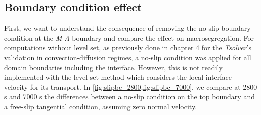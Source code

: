 
\subsection{Boundary condition effect}

First, we want to understand the consequence of removing the no-slip boundary condition at the \emph{M-A} boundary and compare the effect on macrosegregation. 
For computations without level set, as previously done in chapter 4 for the \emph{Tsolver}'s validation in convection-diffusion regimes, a no-slip condition was applied for all domain boundaries including 
the interface.
However, this is not readily implemented with the level set method which considers the local interface velocity for its transport.
In \cref{fig:slipbc_2800,fig:slipbc_7000}, we compare at 2800 s and 7000 s the differences between a no-slip condition on the top boundary 
and a free-slip tangential condition, assuming zero normal velocity. 

